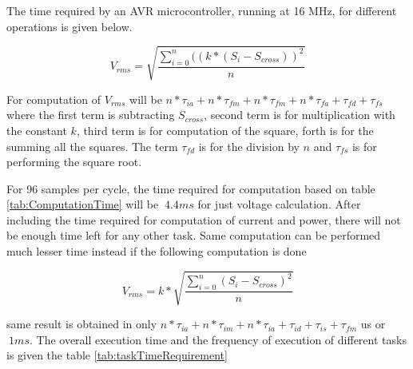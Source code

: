 
The time required by an AVR microcontroller, running at 16 MHz, for different operations is given below.

\begin{equation}
V_{rms} = \sqrt{\frac{\sum_{i=0}^{n} ((k* (S_i - S_{cross}))^2}{n}}
\end{equation}

For computation of $V_{rms}$ will be $ n * \tau_{ia} + n * \tau_{fm} + n * \tau_{fm} + n *  \tau_{fa} +  \tau_{fd} +  \tau_{fs}$ where the first term is subtracting $S_{cross}$, second term is for multiplication with the constant $k$, third term is for computation of the square, forth is for the summing all the squares. The term  $\tau_{fd}$ is for the division by $n$ and  $\tau_{fs}$ is for performing the square root.

For 96 samples per cycle, the time required for computation based on table \ref{tab:ComputationTime} will be $~ 4.4 ms$ for just voltage calculation. After including the time required for computation of current and power, there will not be enough time left for any other task. Same computation can be performed much lesser time instead if the following computation is done

\begin{equation}
V_{rms} = k * \sqrt{\frac{\sum_{i=0}^{n}(S_i - S_{cross})^2}{n}}
\end{equation}

same result is obtained in only $ n * \tau_{ia} + n *  \tau_{im} + n *  \tau_{ia} +  \tau_{id} +  \tau_{is} +  \tau_{fm}$ us or $~ 1 ms$.  The overall execution time and the frequency of execution of different tasks is given the table \ref{tab:taskTimeRequirement}

